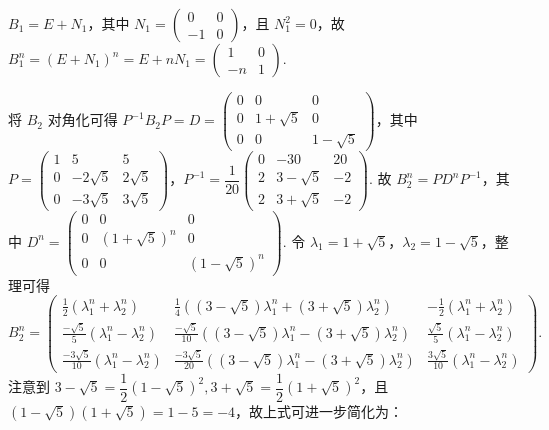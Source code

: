 \begin{enumerate}
    $B_1 = E + N_1$，其中 $N_1 = \begin{pmatrix}
        0 & 0 \\
        -1 & 0
    \end{pmatrix}$，且 $N_1^2 = 0$，故 $B_1^n = (E + N_1)^n = E + nN_1 = \begin{pmatrix}
        1 & 0 \\
        -n & 1
    \end{pmatrix}$.

    将 $B_2$ 对角化可得 $P^{-1}B_2P = D =\begin{pmatrix}
        0 & 0 & 0 \\
        0 & 1+\sqrt{5} & 0 \\
        0 & 0 & 1-\sqrt{5}
    \end{pmatrix}$，其中 $P = \begin{pmatrix}
        1 & 5 & 5 \\
        0 & -2\sqrt{5} & 2\sqrt{5} \\
        0 & -3\sqrt{5} & 3\sqrt{5}
    \end{pmatrix}$，$P^{-1} = \dfrac{1}{20}\begin{pmatrix}
        0 & -30 & 20 \\
        2 & 3-\sqrt{5} & -2 \\
        2 & 3+\sqrt{5} & -2
    \end{pmatrix}$. 故 $B_2^n = PD^nP^{-1}$，其中 $D^n = \begin{pmatrix}
        0 & 0 & 0 \\
        0 & (1+\sqrt{5})^n & 0 \\
        0 & 0 & (1-\sqrt{5})^n
    \end{pmatrix}$. 令 $\lambda_1=1+\sqrt{5}$，$\lambda_2=1-\sqrt{5}$，整理可得 \[ B_2^n = \begin{pmatrix}
        \frac{1}{2}(\lambda_1^n+\lambda_2^n) & \frac{1}{4}((3-\sqrt{5})\lambda_1^n + (3+\sqrt{5})\lambda_2^n) & -\frac{1}{2}(\lambda_1^n+\lambda_2^n) \\
        \frac{-\sqrt{5}}{5}(\lambda_1^n - \lambda_2^n) & \frac{-\sqrt{5}}{10}((3-\sqrt{5})\lambda_1^n - (3+\sqrt{5})\lambda_2^n) & \frac{\sqrt{5}}{5}(\lambda_1^n - \lambda_2^n) \\
        \frac{-3\sqrt{5}}{10}(\lambda_1^n - \lambda_2^n) & \frac{-3\sqrt{5}}{20}((3-\sqrt{5})\lambda_1^n - (3+\sqrt{5})\lambda_2^n) & \frac{3\sqrt{5}}{10}(\lambda_1^n - \lambda_2^n)
    \end{pmatrix}. \]
    注意到 $3-\sqrt{5}=\dfrac{1}{2}(1-\sqrt{5})^2, 3+\sqrt{5}=\dfrac{1}{2}(1+\sqrt{5})^2$，且 $(1-\sqrt{5})(1+\sqrt{5}) = 1 - 5 = -4$，故上式可进一步简化为：

\end{enumerate}
